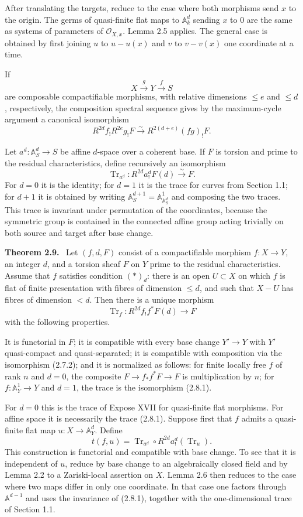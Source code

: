 \documentclass[12pt]{article}
\newcommand{\Ocal}{\mathcal O}
\newenvironment{statement}[1]{\par\medskip\noindent\textbf{#1.}\ }{\par\medskip}
\begin{document}
After translating the targets, reduce to the case where both morphisms send \(x\) to the origin. The germs of quasi-finite flat maps to \(\mathbb A^d_k\) sending \(x\) to \(0\) are the same as systems of parameters of \(\Ocal_{X,x}\). Lemma 2.5 applies. The general case is obtained by first joining \(u\) to \(u-u(x)\) and \(v\) to \(v-v(x)\) one coordinate at a time.

If
\[
X\xrightarrow{g}Y\xrightarrow{f}S
\]
are composable compactifiable morphisms, with relative dimensions \(\leq e\) and \(\leq d\), respectively, the composition spectral sequence gives by the maximum-cycle argument a canonical isomorphism
\[
R^{2d}f_!R^{2e}g_!F
\xrightarrow{\sim}
R^{2(d+e)}(fg)_!F.
\tag{2.7.2}
\]

Let \(a^d:\mathbb A^d_S\to S\) be affine \(d\)-space over a coherent base. If \(F\) is torsion and prime to the residual characteristics, define recursively an isomorphism
\[
\operatorname{Tr}_{a^d}:R^{2d}a^d_!F(d)\xrightarrow{\sim}F.
\tag{2.8.1}
\]
For \(d=0\) it is the identity; for \(d=1\) it is the trace for curves from Section 1.1; for \(d+1\) it is obtained by writing \(\mathbb A^{d+1}_S=\mathbb A^1_{\mathbb A^d_S}\) and composing the two traces. This trace is invariant under permutation of the coordinates, because the symmetric group is contained in the connected affine group acting trivially on both source and target after base change.

\begin{statement}{Theorem 2.9}
Let \((f,d,F)\) consist of a compactifiable morphism \(f:X\to Y\), an integer \(d\), and a torsion sheaf \(F\) on \(Y\) prime to the residual characteristics. Assume that \(f\) satisfies condition \((*)_d\): there is an open \(U\subset X\) on which \(f\) is flat of finite presentation with fibres of dimension \(\leq d\), and such that \(X-U\) has fibres of dimension \(<d\). Then there is a unique morphism
\[
\operatorname{Tr}_f:R^{2d}f_!f^*F(d)\to F
\]
with the following properties.

It is functorial in \(F\); it is compatible with every base change \(Y'\to Y\) with \(Y'\) quasi-compact and quasi-separated; it is compatible with composition via the isomorphism (2.7.2); and it is normalized as follows: for finite locally free \(f\) of rank \(n\) and \(d=0\), the composite \(F\to f_*f^*F\to F\) is multiplication by \(n\); for \(f:\mathbb A^1_Y\to Y\) and \(d=1\), the trace is the isomorphism (2.8.1).
\end{statement}

For \(d=0\) this is the trace of Expose XVII for quasi-finite flat morphisms. For affine space it is necessarily the trace (2.8.1). Suppose first that \(f\) admits a quasi-finite flat map \(u:X\to\mathbb A^d_Y\). Define
\[
t(f,u)=\operatorname{Tr}_{a^d}\circ R^{2d}a^d_!(\operatorname{Tr}_u).
\]
This construction is functorial and compatible with base change. To see that it is independent of \(u\), reduce by base change to an algebraically closed field and by Lemma 2.2 to a Zariski-local assertion on \(X\). Lemma 2.6 then reduces to the case where two maps differ in only one coordinate. In that case one factors through \(\mathbb A^{d-1}\) and uses the invariance of (2.8.1), together with the one-dimensional trace of Section 1.1.
\end{document}
